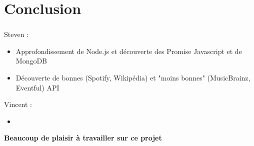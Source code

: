 \documentclass[10pt]{beamer}
\begin{document}
\section{Conclusion}
\begin{frame}
	\frametitle{\secname}
	Steven :
	\begin{itemize}
		\item Approfondissement de Node.js et découverte des Promise Javascript et de MongoDB
		\item Découverte de bonnes (Spotify, Wikipédia) et "moins bonnes" (MusicBrainz, Eventful) API
	\end{itemize}
	Vincent :
	\begin{itemize}
		\item
	\end{itemize}
	\Large\textbf{Beaucoup de plaisir à travailler sur ce projet}
\end{frame}
\end{document}
